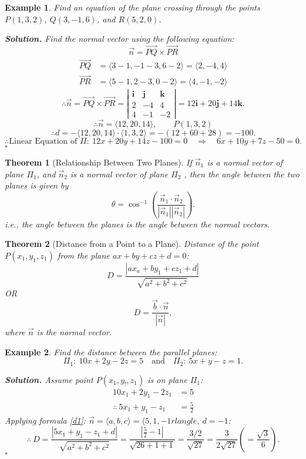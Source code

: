 \documentclass[12pt,a4paper]{article}
\newtheorem{thm}{Theorem}[subsection]
\newtheorem{eg}{Example}[subsection]
\newenvironment*{sol}{\par\indent\textbf{Solution. }}{\hfill{$\square$}\par}
\def\vecb{\vec{b}}
\def\vecn{\vec{n}}
\def\veci{\boldsymbol{\textbf{i}}}
\def\vecj{\boldsymbol{\textbf{j}}}
\def\veck{\boldsymbol{\textbf{k}}}
\begin{document}
\begin{eg}
	Find an equation of the plane crossing through the points $P(1,3,2)$, $Q(3,-1,6)$, and $R(5,2,0)$.
	\begin{sol}
		Find the normal vector using the following equation: \[			\vecn=\overrightarrow{PQ}\times\overrightarrow{PR}\]
		\[\begin{aligned}
			\overrightarrow{PQ}&=\langle3-1,-1-3,6-2\rangle=\langle2,-4,4\rangle\\
			\overrightarrow{PR}&=\langle5-1,2-3,0-2\rangle=\langle4,-1,-2\rangle
		\end{aligned}\]
		\[\therefore\vecn=\overrightarrow{PQ}\times\overrightarrow{PR}=\left|\begin{matrix}\veci&\vecj&\veck\\2&-4&4\\4&-1&-2\end{matrix}\right|=12\veci+20\vecj+14\veck.\]
		\[\therefore \vecn=\langle12,20,14\rangle,\qquad P(1,3,2)\]
		\[\therefore d=-\langle12,20,14\rangle\cdot\langle1,3,2\rangle=-(12+60+28)=-100.\]
		\[\therefore \text{Linear Equation of } \Pi:\  12x+20y+14z-100=0\quad\Longrightarrow\quad6x+10y+7z-50=0.\]
	\end{sol}
\end{eg}
\begin{thm}[Relationship Between Two Planes]
	If $\vecn_1$ is a normal vector of plane $\Pi_1$, and $\vecn_2$ is a normal vector of plane $\Pi_2$	, then the angle between the two planes is given by \[\theta=\cos^{-1}\left(\frac{\vecn_1\cdot\vecn_2}{|\vecn_1||\vecn_2|}\right).\]
	i.e., the angle between the planes is the angle between the normal vectors. 
\end{thm}
\begin{thm}[Distance from a Point to a Plane]
	Distance of the point $P(x_1,y_1,z_1)$ from the plane $ax+by+cz+d=0$: 
	\begin{equation}\label{d1}
		D=\frac{|ax_a+by_1+cz_1+d|}{\sqrt{a^2+b^2+c^2}} 	
	\end{equation}
	OR
	\begin{equation}\label{d2}
	D=\frac{\vecb\cdot\vecn}{|\vecn|}, 	
	\end{equation}
	where $\vecn$ is the normal vector. 
\end{thm}
\begin{eg}
	Find the distance between the parallel planes: \[\Pi_1:\ 10x+2y-2z=5\quad\text{and}\quad\Pi_2:\ 5x+y-z=1.\]
	\begin{sol}
		Assume point $P(x_1,y_!,z_1)$ is on plane $\Pi_1$: \[\begin{aligned}10x_1+2y_1-2z_1&=5\\\therefore\ 5x_1+y_1-z_1&=\frac{5}{2}\end{aligned}\]	
		Applying formula \ref{d1}: $\vecn=\langle a,b,c\rangle=\langle5,1,-1rlangle,\ d=-1$: 
		\[\therefore\ D=\frac{|5x_1+y_1-z_1+d|}{\sqrt{a^2+b^2+c^2}}=\frac{|\frac{5}{2}-1|}{\sqrt{26+1+1}}=\frac{3/2}{\sqrt{27}}=\frac{3}{2\sqrt{27}}\left(=\frac{\sqrt{3}}{6}\right).\]
	\end{sol}
\end{eg}
\end{document}
